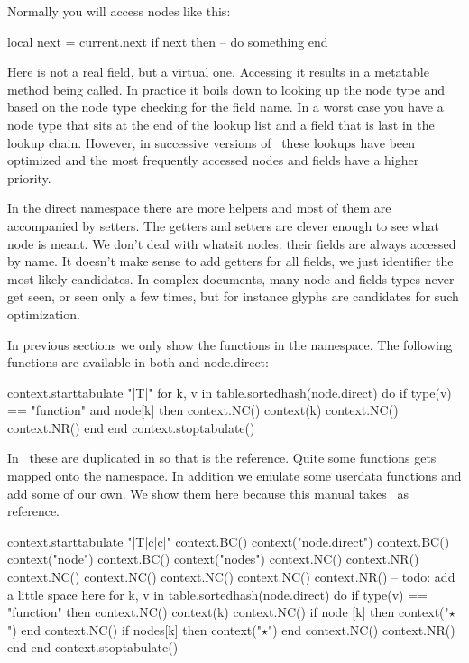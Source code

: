 Normally you will access nodes like this:

\starttyping
local next = current.next
if next then
    -- do something
end
\stoptyping

Here  is not a real field, but a virtual one. Accessing it results in
a metatable method being called. In practice it boils down to looking up the node
type and based on the node type checking for the field name. In a worst case you
have a node type that sits at the end of the lookup list and a field that is last
in the lookup chain. However, in successive versions of \LUATEX\ these lookups
have been optimized and the most frequently accessed nodes and fields have a
higher priority.

In the direct namespace there are more helpers and most of them are accompanied
by setters. The getters and setters are clever enough to see what node is meant.
We don't deal with whatsit nodes: their fields are always accessed by name. It
doesn't make sense to add getters for all fields, we just identifier the most
likely candidates. In complex documents, many node and fields types never get
seen, or seen only a few times, but for instance glyphs are candidates for such
optimization.

In previous sections we only show the functions in the 
namespace. The following functions are available in both  and \type
{node.direct}:

\startcolumns[n=3]
\startluacode
    context.starttabulate { "|T|" }
    for k, v in table.sortedhash(node.direct) do
        if type(v) == "function" and node[k] then
            context.NC() context(k)
            context.NC() context.NR()
        end
    end
    context.stoptabulate()
\stopluacode
\stopcolumns

In \CONTEXT\ these are duplicated in  so that is the reference.
Quite some functions gets mapped onto the  namespace. In addition we
emulate some userdata functions and add some of our own. We show them here because
this manual takes \CONTEXT\ as reference.

\startcolumns[n=2]
\startluacode
    context.starttabulate { "|T|c|c|" }
        context.BC() context("node.direct")
        context.BC() context("node")
        context.BC() context("nodes")
        context.NC() context.NR()
        context.NC()
        context.NC()
        context.NC()
        context.NC() context.NR()
        -- todo: add a little space here
        for k, v in table.sortedhash(node.direct) do
            if type(v) == "function" then
                context.NC() context(k)
                context.NC() if node [k] then context("$⋆$") end
                context.NC() if nodes[k] then context("$⋆$") end
                context.NC() context.NR()
            end
        end
    context.stoptabulate()
\stopluacode
\stopcolumns

